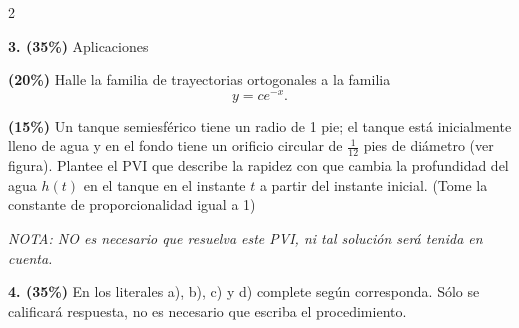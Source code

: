 \documentclass[11pt]{article}
\begin{document}
\begin{multicols}{2}

\textbf{3. (35\%)} Aplicaciones

\begin{opciones}
\item[(a)] \textbf{(20\%)} Halle la familia de trayectorias ortogonales a la familia
\[
y=ce^{-x}.
\]

\vspace{4cm}

\item[(b)] \textbf{(15\%)} Un tanque semiesférico tiene un radio de 1 pie; el tanque está inicialmente lleno de agua y en el fondo tiene un orificio circular de $\frac{1}{12}$ pies de diámetro (ver figura). Plantee el PVI que describe la rapidez con que cambia la profundidad del agua $h(t)$ en el tanque en el instante $t$ a partir del instante inicial. (Tome la constante de proporcionalidad igual a 1)

\textit{NOTA: NO es necesario que resuelva este PVI, ni tal solución será tenida en cuenta.}
\end{opciones}

\columnbreak

\begin{center}
\end{center}

\vspace{3cm}

\end{multicols}

\noindent\textbf{4. (35\%)} En los literales a), b), c) y d) complete según corresponda. Sólo se calificará respuesta, no es necesario que escriba el procedimiento.
\end{document}
